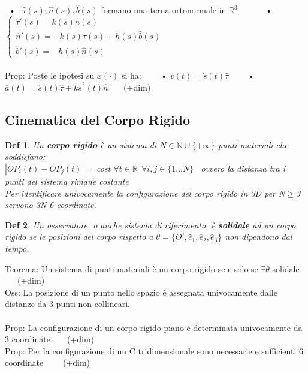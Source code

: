 \documentclass{article}
\theoremstyle{unnumbered}
\newtheorem* {theoremT}{Def}
\theoremstyle{unnumbered1}
\newenvironment{defi}{\begin{gBox}\begin{theoremT}}{\end{theoremT}\end{gBox}}
\begin{document}
\ • \ $\hat{\tau}(s), \hat{n}(s), \hat{b}(s)$ formano una terna ortonormale in $\mathbb{R}^3$ \ \ \ \ \ \ • \
$\begin{cases}
\hat{\tau}'(s)=k(s)\hat{n}(s) \\
\hat{n}'(s)=-k(s)\hat{\tau}(s)+h(s)\hat{b}(s)\\
\hat{b}'(s)=-h(s)\hat{n}(s)
\end{cases}$ \\ \\
Prop: Poste le ipotesi su $\overline{x}(\cdot)$ si ha: \ \ \ \
• $\overline{v}(t)=\dot{s}(t)\hat{\tau}$ \ \ \ \
• $\overline{a}(t)=\ddot{s}(t)\hat{\tau}+k\dot{s}^2(t)\hat{n}$ \ \ \ (+dim)\\




\subsection{Cinematica del Corpo Rigido}
%
\begin{defi}
Un \textbf{corpo rigido} è un sistema di $N\in\mathbb{N}\cup\{+\infty\}$ punti materiali che soddisfano: \\ $|\overline{OP}_i(t) - \overline{OP}_j(t)|$ = cost   $\forall t \in \mathbb{R} \ \ \forall i,j \in \{1...N\}$ 
\  ovvero la distanza tra i punti del sistema rimane costante\\
Per identificare univocamente la configurazione del corpo rigido in 3D per N$\ge$3 servono 3N-6 coordinate.
\end{defi}
%
%
\begin{defi}
Un osservatore, o anche sistema di riferimento, è \textbf{solidale} ad un corpo rigido se le posizioni del corpo rispetto a $\theta = \{O',\hat{e}_1, \hat{e}_2, \hat{e}_3 \} $ non dipendono dal tempo.
\end{defi}
%
Teorema: Un sistema di punti materiali è un corpo rigido se e solo se $\exists \theta$ solidale \ \ \ (+dim) \\
%
Oss: La posizione di un punto nello spazio è assegnata univocamente dalle distanze da 3 punti non collineari. \\ \\
%
Prop: La configurazione di un corpo rigido piano è determinata univocamente da 3 coordinate\ \ \ \ (+dim)\\
%
Prop: Per la configurazione di un C tridimensionale sono necessarie e sufficienti 6 coordinate \ \ \ \ (+dim)\\ \\
\end{document}
